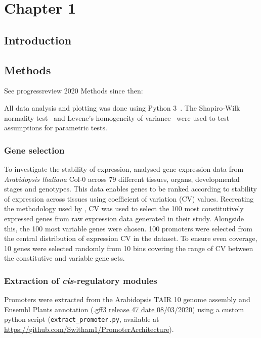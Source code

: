 \chapter{Chapter 1}
\label{ch:1}
\section{Introduction}\label{chapter1:introduction}
\section{Methods}\label{chapter1:methods}
See progressreview 2020
Methods since then:


All data analysis and plotting was done using Python 3~\autocite{pythoncoreteamPythonDynamicOpen2020}.
The Shapiro\hyp{}Wilk normality test~\autocite{shapiroAnalysisVarianceTest1965} and Levene's homogeneity of variance~\autocite{leveneRobustTestsEquality1960} were used to test assumptions for parametric tests.

\subsection{Gene selection}\label{gene-selection}

To investigate the stability of expression, \textcite*{czechowskiGenomeWideIdentificationTesting2005} analysed gene expression data from \textit{Arabidopsis thaliana} Col-0 across 79 different tissues, organs, developmental stages and genotypes.
This data enables genes to be ranked according to stability of expression across tissues using coefficient of variation (CV) values.
Recreating the methodology used by \textcite*{czechowskiGenomeWideIdentificationTesting2005}, CV was used to select the 100 most constitutively expressed genes from raw expression data generated in their study.
Alongside this, the 100 most variable genes were chosen.
100 promoters were selected from the central distribution of expression CV in the \textcite*{czechowskiGenomeWideIdentificationTesting2005} dataset.
To ensure even coverage, 10 genes were selected randomly from 10 bins covering the range of CV between the constitutive and variable gene sets.

\subsection{Extraction of \textit{cis}-regulatory modules}\label{extraction-of-cis-regulatory-modules}

Promoters were extracted from the Arabidopsis TAIR 10 \autocite{lameschArabidopsisInformationResource2012} genome assembly and Ensembl Plants annotation (\href{ftp://ftp.ensemblgenomes.org/pub/release-47/plants/gff3/arabidopsis_thaliana/}{.gff3 release 47 date 08/03/2020}) using a custom python script (\texttt{extract\_promoter.py}, available at \url{https://github.com/Switham1/PromoterArchitecture}).

